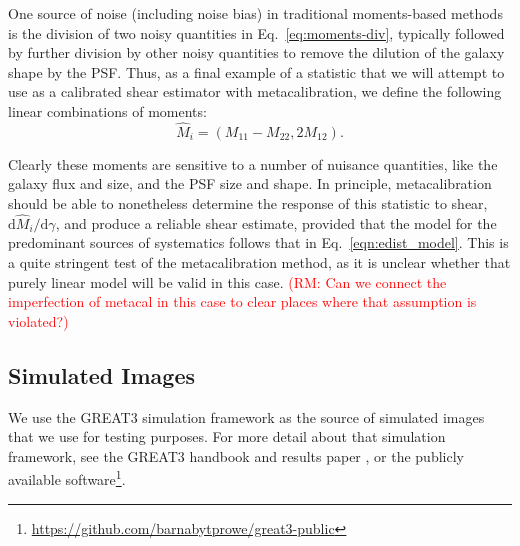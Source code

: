 \documentclass[iop]{emulateapj}
\newcommand\rmcomment[1]{\textcolor{red}{(RM: #1)}}
\begin{document}
One source of noise (including noise bias) in traditional moments-based methods is the
division of two noisy quantities in Eq.~\ref{eq:moments-div},
typically followed by further division by other noisy quantities to
remove the dilution of the galaxy shape by the PSF.  Thus, as a final
example of a statistic that we will attempt to use as a calibrated
shear estimator with metacalibration, we define the following linear
combinations of moments:
\begin{equation}
\hat{M}_i = (M_{11}-M_{22}, 2M_{12}).
\end{equation}

Clearly these moments are sensitive to a number of nuisance
quantities, like the galaxy flux and size, and the PSF size and shape.
In principle, metacalibration should be able to nonetheless determine
the response of this statistic to shear,
$\mathrm{d}\hat{M}_i/\mathrm{d}\gamma$, and produce a reliable shear
estimate, provided that the model for the predominant sources of
systematics follows that in Eq.~\ref{eqn:edist_model}.  This is a
quite stringent test of the metacalibration method, as it is unclear
whether that purely linear model will be valid in this case.
\rmcomment{Can we connect the imperfection of metacal in this case to
  clear places where that assumption is violated?}

\subsection{Simulated Images}

We use the GREAT3 simulation framework as the source of simulated
images that we use for testing purposes.  For more detail about that
simulation framework, see the GREAT3 handbook
\citep{2014ApJS..212....5M} and results paper
\citep{2015MNRAS.450.2963M}, or the publicly available
software\footnote{\url{https://github.com/barnabytprowe/great3-public}}.
\end{document}
